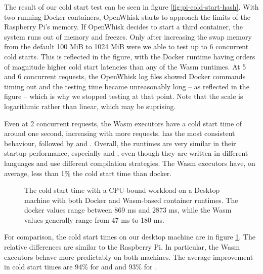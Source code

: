 The result of our cold start test can be seen in figure \ref{fig:pi-cold-start-hash}. With two running Docker containers, OpenWhisk starts to approach the limits of the Raspberry Pi's memory. If OpenWhisk decides to start a third container, the system runs out of memory and freezes. Only after increasing the swap memory from the default 100 MiB to 1024 MiB were we able to test up to 6 concurrent cold starts. This is reflected in the figure, with the Docker runtime having orders of magnitude higher cold start latencies than any of the Wasm runtimes. At 5 and 6 concurrent requests, the OpenWhisk log files showed Docker commands timing out and the testing time became unreasonably long -- as reflected in the figure -- which is why we stopped testing at that point. Note that the scale is logarithmic rather than linear, which may be suprising.

Even at 2 concurrent requests, the Wasm executors have a cold start time of around one second, increasing with more requests.  has the most consistent behaviour, followed by  and . Overall, the runtimes are very similar in their startup performance, especially  and , even though they are written in different languages and use different compilation strategies. The Wasm executors have, on average, less than 1\% the cold start time than docker.


\begin{figure}
    \begin{center}
        
    \end{center}
    \caption{The cold start time with a CPU-bound workload on a Desktop machine with both Docker and Wasm-based container runtimes. The docker values range between 869 ms and 2873 ms, while the Wasm values generally range from 47 ms to 180 ms.}
    \label{fig:pc-cold-start-hash}
\end{figure}

For comparison, the cold start times on our  desktop machine are in figure \ref{fig:pc-cold-start-hash}. The relative differences are similar to the Raspberry Pi. In particular, the Wasm executors behave more predictably on both machines. The average improvement in cold start times are 94\% for  and  and 93\% for .

